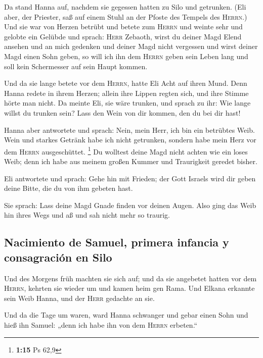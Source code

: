  Da stand Hanna auf, nachdem sie gegessen hatten zu Silo
und getrunken. (Eli aber, der Priester, saß auf einem Stuhl an der
Pfoste des Tempels des \textsc{Herrn}.)  Und sie war von
Herzen betrübt und betete zum \textsc{Herrn} und weinte sehr
 und gelobte ein Gelübde und sprach: \textsc{Herr}
Zebaoth, wirst du deiner Magd Elend ansehen und an mich gedenken und
deiner Magd nicht vergessen und wirst deiner Magd einen Sohn geben, so
will ich ihn dem \textsc{Herrn} geben sein Leben lang und soll kein
Schermesser auf sein Haupt kommen.

 Und da sie lange betete vor dem \textsc{Herrn}, hatte
Eli Acht auf ihren Mund.  Denn Hanna redete in ihrem
Herzen; allein ihre Lippen regten sich, und ihre Stimme hörte man nicht.
Da meinte Eli, sie wäre trunken,  und sprach zu ihr: Wie
lange willst du trunken sein? Lass den Wein von dir kommen, den du bei
dir hast!

 Hanna aber antwortete und sprach: Nein, mein Herr, ich
bin ein betrübtes Weib. Wein und starkes Getränk habe ich nicht
getrunken, sondern habe mein Herz vor dem \textsc{Herrn} ausgeschüttet.
\footnote{\textbf{1:15} Ps 62,9}  Du wolltest deine Magd
nicht achten wie ein loses Weib; denn ich habe aus meinem großen Kummer
und Traurigkeit geredet bisher.

 Eli antwortete und sprach: Gehe hin mit Frieden; der
Gott Israels wird dir geben deine Bitte, die du von ihm gebeten hast.

 Sie sprach: Lass deine Magd Gnade finden vor deinen
Augen. Also ging das Weib hin ihres Wegs und aß und sah nicht mehr so
traurig.

\hypertarget{nacimiento-de-samuel-primera-infancia-y-consagraciuxf3n-en-silo}{%
\subsection{Nacimiento de Samuel, primera infancia y consagración en
Silo}\label{nacimiento-de-samuel-primera-infancia-y-consagraciuxf3n-en-silo}}

 Und des Morgens früh machten sie sich auf; und da sie
angebetet hatten vor dem \textsc{Herrn}, kehrten sie wieder um und kamen
heim gen Rama. Und Elkana erkannte sein Weib Hanna, und der
\textsc{Herr} gedachte an sie.

 Und da die Tage um waren, ward Hanna schwanger und gebar
einen Sohn und hieß ihn Samuel: „denn ich habe ihn von dem
\textsc{Herrn} erbeten.``

